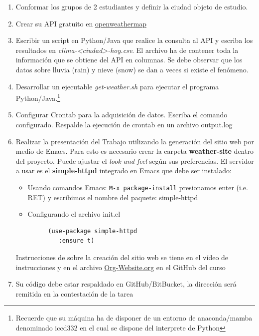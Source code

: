 \documentclass{article}
\begin{document}
\begin{enumerate}
\item Conformar los grupos de 2 estudiantes y definir la ciudad
objeto de estudio.
\item Crear su API gratuito en \href{https://openweathermap.org/current\#one}{openweathermap}
\item Escribir un script en Python/Java que realice la consulta al
API y escriba los resultados en \emph{clima-<ciudad>-hoy.csv}. El
archivo ha de contener toda la información que se obtiene del
API en columnas. Se debe observar que los datos sobre lluvia
(rain) y nieve (snow) se dan a veces si existe el fenómeno.
\item Desarrollar un ejecutable \emph{get-weather.sh} para ejecutar el
programa Python/Java.\footnote{Recuerde que su máquina ha de disponer de un entorno de
anaconda/mamba denominado iccd332 en el cual se dispone del interprete
de Python}

\item Configurar Crontab para la adquisición de datos. Escriba el
comando configurado. Respalde la ejecución de crontab en un
archivo output.log
\item Realizar la presentación del Trabajo utilizando la generación
del sitio web por medio de Emacs. Para esto es necesario crear
la carpeta \textbf{\textbf{weather-site}} dentro del proyecto. Puede ajustar el
\emph{look and feel} según sus preferencias. El servidor a usar es
el \textbf{\textbf{simple-httpd}} integrado en Emacs que debe ser instalado:
\begin{itemize}
\item Usando comandos Emacs: \texttt{M-x package-install} presionamos
enter (i.e. RET) y escribimos el nombre del paquete:
simple-httpd
\item Configurando el archivo init.el
\end{itemize}

\begin{verbatim}
         (use-package simple-httpd
            :ensure t)
\end{verbatim}

Instrucciones de sobre la creación del sitio web se tiene en el
vídeo de instrucciones y en el archivo \href{https://github.com/LeninGF/EPN-Lectures/blob/main/iccd332ArqComp-2024-A/Proyectos/Org-Website.org}{Org-Website.org} en el
GitHub del curso

\item Su código debe estar respaldado en GitHub/BitBucket, la
dirección será remitida en la contestación de la tarea
\end{enumerate}
\end{document}
